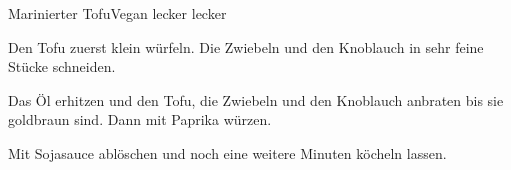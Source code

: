 
\begin{recipe}[]{Marinierter Tofu}{Vegan lecker lecker}{}



\step%
Den Tofu zuerst klein w\"urfeln. Die Zwiebeln und den Knoblauch in sehr feine
St\"ucke schneiden.

\step%
Das \"Ol erhitzen und den Tofu, die Zwiebeln und den Knoblauch anbraten bis sie
goldbraun sind. Dann mit Paprika w\"urzen.

\step%
Mit Sojasauce abl\"oschen und noch eine weitere Minuten k\"ocheln lassen.


\end{recipe}
